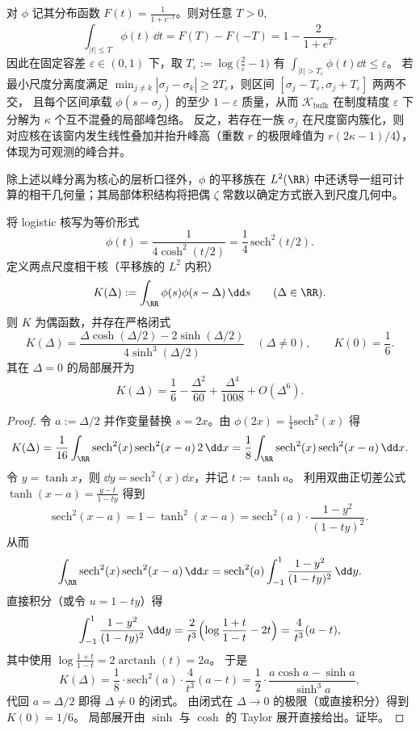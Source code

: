 \begin{remark}\label{rem:xi-bulk-curvature-peak-resolution}
对 \(\phi\) 记其分布函数 \(F(t)=\frac{1}{1+e^{-t}}\)。则对任意 \(T>0\),
\[
\int_{|t|\le T}\phi(t)\,\dd t
=F(T)-F(-T)
=1-\frac{2}{1+e^{T}}.
\]
因此在固定容差 \(\varepsilon\in(0,1)\) 下，取 \(T_\varepsilon:=\log\!\bigl(\frac{2}{\varepsilon}-1\bigr)\) 有
\(
\int_{|t|>T_\varepsilon}\phi(t)\dd t\le \varepsilon
\)。
若最小尺度分离度满足 \(\min_{j\neq k}|\sigma_j-\sigma_k|\ge 2T_\varepsilon\)，则区间 \([\sigma_j-T_\varepsilon,\sigma_j+T_\varepsilon]\) 两两不交，
且每个区间承载 \(\phi(s-\sigma_j)\) 的至少 \(1-\varepsilon\) 质量，从而 \(\mathcal{K}_{\mathrm{bulk}}\) 在制度精度 \(\varepsilon\) 下分解为 \(\kappa\) 个互不混叠的局部峰包络。
反之，若存在一族 \(\sigma_j\) 在尺度窗内簇化，则对应核在该窗内发生线性叠加并抬升峰高（重数 \(r\) 的极限峰值为 \(r(2\kappa-1)/4\)），体现为可观测的峰合并。
\end{remark}

除上述以峰分离为核心的层析口径外，\(\phi\) 的平移族在 \(L^2(\RR)\) 中还诱导一组可计算的相干几何量；其局部体积结构将把偶 \(\zeta\) 常数以确定方式嵌入到尺度几何中。

\begin{proposition}\label{prop:xi-scale-coherence-kernel-closed-form}
将 logistic 核写为等价形式
\[
\phi(t)=\frac{1}{4\cosh^2(t/2)}=\frac{1}{4}\,\mathrm{sech}^2(t/2).
\]
定义两点尺度相干核（平移族的 \(L^2\) 内积）
\[
K(\Delta):=\int_{\RR}\phi(s)\phi(s-\Delta)\,\dd s\qquad(\Delta\in\RR).
\]
则 \(K\) 为偶函数，并存在严格闭式
\[
\boxed{\;
K(\Delta)=\frac{\Delta\cosh(\Delta/2)-2\sinh(\Delta/2)}{4\sinh^3(\Delta/2)}\quad(\Delta\neq 0),
\qquad
K(0)=\frac{1}{6}.\;}
\]
其在 \(\Delta=0\) 的局部展开为
\[
K(\Delta)=\frac{1}{6}-\frac{\Delta^2}{60}+\frac{\Delta^4}{1008}+O(\Delta^6).
\]
\end{proposition}
\begin{proof}
令 \(a:=\Delta/2\) 并作变量替换 \(s=2x\)。由 \(\phi(2x)=\frac14\mathrm{sech}^2(x)\) 得
\[
K(\Delta)=\frac{1}{16}\int_{\RR}\mathrm{sech}^2(x)\,\mathrm{sech}^2(x-a)\,2\,\dd x
=\frac18\int_{\RR}\mathrm{sech}^2(x)\,\mathrm{sech}^2(x-a)\,\dd x.
\]
令 \(y=\tanh x\)，则 \(\dd y=\mathrm{sech}^2(x)\dd x\)，并记 \(t:=\tanh a\)。
利用双曲正切差公式
\(
\tanh(x-a)=\frac{y-t}{1-ty}
\)
得到
\[
\mathrm{sech}^2(x-a)=1-\tanh^2(x-a)=\mathrm{sech}^2(a)\cdot\frac{1-y^2}{(1-ty)^2}.
\]
从而
\[
\int_{\RR}\mathrm{sech}^2(x)\,\mathrm{sech}^2(x-a)\,\dd x
=\mathrm{sech}^2(a)\int_{-1}^{1}\frac{1-y^2}{(1-ty)^2}\,\dd y.
\]
直接积分（或令 \(u=1-ty\)）得
\[
\int_{-1}^{1}\frac{1-y^2}{(1-ty)^2}\,\dd y
=\frac{2}{t^3}\Bigl(\log\frac{1+t}{1-t}-2t\Bigr)
=\frac{4}{t^3}(a-t),
\]
其中使用 \(\log\frac{1+t}{1-t}=2\operatorname{arctanh}(t)=2a\)。
于是
\[
K(\Delta)
=\frac18\cdot \mathrm{sech}^2(a)\cdot \frac{4}{t^3}(a-t)
=\frac12\cdot\frac{a\cosh a-\sinh a}{\sinh^3 a},
\]
代回 \(a=\Delta/2\) 即得 \(\Delta\neq 0\) 的闭式。
由闭式在 \(\Delta\to 0\) 的极限（或直接积分）得到 \(K(0)=1/6\)。
局部展开由 \(\sinh\) 与 \(\cosh\) 的 Taylor 展开直接给出。证毕。
\end{proof}

